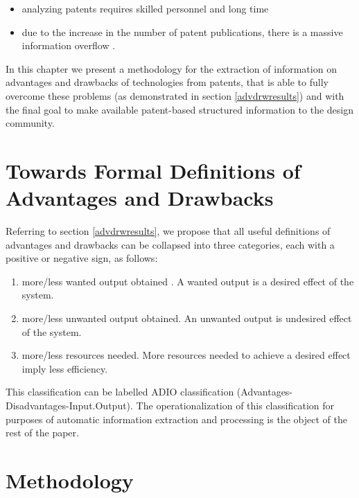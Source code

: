 \documentclass[b5paper,]{book}
\providecommand{\tightlist}{%
  \setlength{\itemsep}{0pt}\setlength{\parskip}{0pt}}
\theoremstyle{definition}
\theoremstyle{definition}
\theoremstyle{definition}
\theoremstyle{remark}
\begin{document}
\begin{itemize}
\tightlist
\item
  analyzing patents requires skilled personnel and long time
  \citep{leon2007trends}
\item
  due to the increase in the number of patent publications, there is a
  massive information overflow \citep{bergmann2008evaluating}.
\end{itemize}

In this chapter we present a methodology for the extraction of
information on advantages and drawbacks of technologies from patents,
that is able to fully overcome these problems (as demonstrated in
section \ref{advdrwresults}) and with the final goal to make available
patent-based structured information to the design community.

\section{Towards Formal Definitions of Advantages and
Drawbacks}\label{towards-formal-definitions-of-advantages-and-drawbacks}

Referring to section \ref{advdrwresults}, we propose that all useful
definitions of advantages and drawbacks can be collapsed into three
categories, each with a positive or negative sign, as follows:

\begin{enumerate}
\def\labelenumi{\arabic{enumi}.}
\tightlist
\item
  more/less wanted output obtained . A wanted output is a desired effect
  of the system.
\item
  more/less unwanted output obtained. An unwanted output is undesired
  effect of the system.
\item
  more/less resources needed. More resources needed to achieve a desired
  effect imply less efficiency.
\end{enumerate}

This classification can be labelled ADIO classification
(Advantages-Disadvantages-Input.Output). The operationalization of this
classification for purposes of automatic information extraction and
processing is the object of the rest of the paper.

\section{Methodology}\label{methodology-9}
\end{document}

